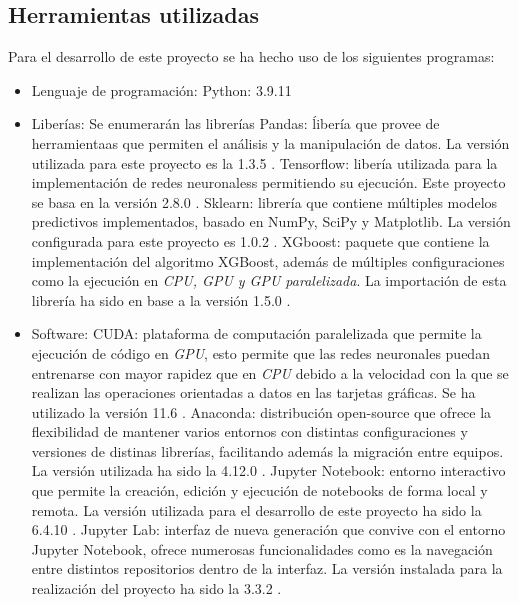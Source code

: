         \subsection{Herramientas utilizadas}
            Para el desarrollo de este proyecto se ha hecho uso de los siguientes programas:

            \begin{itemize}
                \item Lenguaje de programación:
                    \subitem Python: 3.9.11
                \item Liberías: Se enumerarán las librerías 
                    \subitem Pandas: ĺibería que provee de herramientaas que permiten el análisis y la manipulación de datos. La versión utilizada para este proyecto es la 1.3.5 \cite{Pandas}. 
                    \subitem Tensorflow: libería utilizada para la implementación de redes neuronaless permitiendo su ejecución. Este proyecto se basa en la versión 2.8.0 \cite{Tensorflow}.
                    \subitem Sklearn: librería que contiene múltiples modelos predictivos implementados, basado en NumPy, SciPy y Matplotlib. La versión configurada para este proyecto es 1.0.2 \cite{Scikit-Learn}.
                    \subitem XGboost: paquete que contiene la implementación del algoritmo XGBoost, además de múltiples configuraciones como la ejecución en \textit{CPU, GPU y GPU paralelizada}. La importación de esta librería ha sido en base a la versión 1.5.0 \cite{XGBoostLibrary}.
                \item Software:
                    \subitem CUDA: plataforma de computación paralelizada que permite la ejecución de código en \textit{GPU}, esto permite que las redes neuronales puedan entrenarse con mayor rapidez que en \textit{CPU} debido a la velocidad con la que se realizan las operaciones orientadas a datos en las tarjetas gráficas. Se ha utilizado la versión 11.6 \cite{CUDA}. 
                    \subitem Anaconda: distribución open-source que ofrece la flexibilidad de mantener varios entornos con distintas configuraciones y versiones de distinas librerías, facilitando además la migración entre equipos. La versión utilizada ha sido la 4.12.0 \cite{Anaconda}.
                    \subitem Jupyter Notebook: entorno interactivo que permite la creación, edición y ejecución de notebooks de forma local y remota. La versión utilizada para el desarrollo de este proyecto ha sido la 6.4.10 \cite{JupyterNotebook}.
                    \subitem Jupyter Lab: interfaz de nueva generación que convive con el entorno Jupyter Notebook, ofrece numerosas funcionalidades como es la navegación entre distintos repositorios dentro de la interfaz. La versión instalada para la realización del proyecto ha sido la 3.3.2 \cite{JupyterLab}.

\end{itemize}
